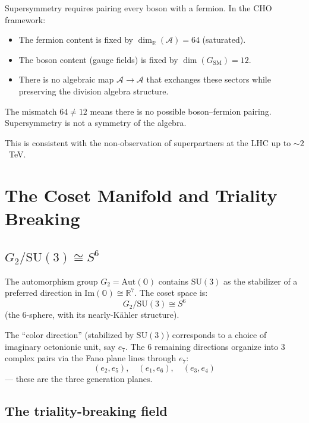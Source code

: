 \documentclass[12pt,a4paper]{article}
\theoremstyle{definition}
\theoremstyle{remark}
\newcommand{\Oct}{\mathbb{O}}
\newcommand{\Real}{\mathbb{R}}
\newcommand{\Alg}{\mathcal{A}}
\newcommand{\SU}{\mathrm{SU}}
\begin{document}
Supersymmetry requires pairing every boson with a fermion. In the CHO 
framework:
\begin{itemize}
\item The fermion content is fixed by $\dim_\Real(\Alg) = 64$ (saturated).
\item The boson content (gauge fields) is fixed by $\dim(G_{\mathrm{SM}}) = 12$.
\item There is no algebraic map $\Alg \to \Alg$ that exchanges these sectors 
while preserving the division algebra structure.
\end{itemize}

The mismatch $64 \neq 12$ means there is no possible boson--fermion 
pairing. Supersymmetry is not a symmetry of the algebra.

This is consistent with the non-observation of superpartners at the LHC 
up to $\sim 2$~TeV.

\section{The Coset Manifold and Triality Breaking}
\label{sec:coset}

\subsection{$G_2/\SU(3) \cong S^6$}

The automorphism group $G_2 = \mathrm{Aut}(\Oct)$ contains $\SU(3)$ 
as the stabilizer of a preferred direction in $\mathrm{Im}(\Oct) \cong 
\Real^7$. The coset space is:
\begin{equation}
G_2/\SU(3) \cong S^6
\end{equation}
(the 6-sphere, with its nearly-K\"ahler structure).

The ``color direction'' (stabilized by $\SU(3)$) corresponds to a 
choice of imaginary octonionic unit, say $e_7$. The 6 remaining 
directions organize into 3 complex pairs via the Fano plane lines 
through $e_7$:
\begin{equation}
(e_2, e_5), \quad (e_1, e_6), \quad (e_3, e_4)
\end{equation}
--- these are the three generation planes.

\subsection{The triality-breaking field}
\end{document}
